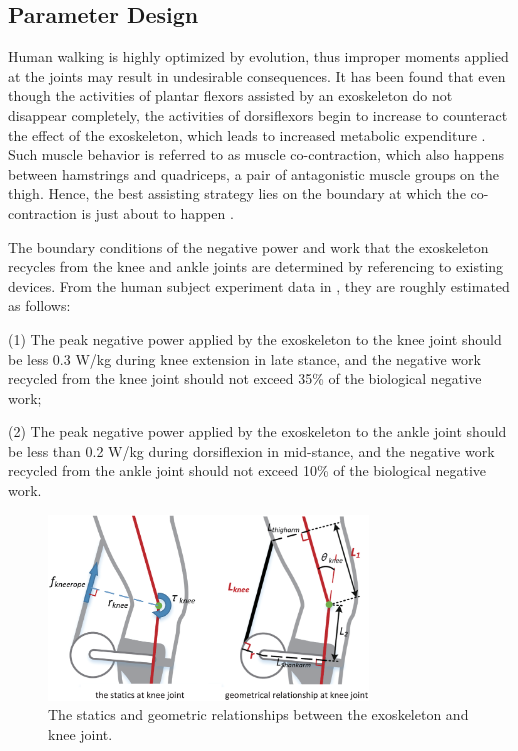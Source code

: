 \documentclass[twocolumn,cleanfoot,10pt]{asme2ej}
\begin{document}
\subsection{Parameter Design}

\label{sec:parameter design}

Human walking is highly optimized by evolution, thus improper moments applied at the joints may result in undesirable consequences.
It has been found that even though the activities of plantar flexors assisted by an exoskeleton do not disappear completely, the activities of dorsiflexors begin to increase to counteract the effect of the exoskeleton, which leads to increased metabolic expenditure \cite{RN4}.
Such muscle behavior is referred to as muscle co-contraction, which also happens between hamstrings and quadriceps, a pair of antagonistic muscle groups on the thigh.
Hence, the best assisting strategy lies on the boundary at which the co-contraction is just about to happen \cite{RN22}. 

The boundary conditions of the negative power and work that the exoskeleton recycles from the knee and ankle joints are determined by referencing to existing devices.
From the human subject experiment data in \cite{RN5,RN18}, they are roughly estimated as follows:

(1) The peak negative power applied by the exoskeleton to the knee joint should be less 0.3 W/kg during knee extension in late stance, and the negative work recycled from the knee joint should not exceed 35\% of the biological negative work;

(2) The peak negative power applied by the exoskeleton to the ankle joint should be less than 0.2 W/kg during dorsiflexion in mid-stance, and the negative work recycled from the ankle joint should not exceed 10\% of the biological negative work.

\begin{figure}[t]
	\centering
	\includegraphics[width=8.5cm]{kneeparameters.eps}
	\caption{The statics and geometric relationships between the exoskeleton and knee joint.}
	\label{fig:kneeparameters}
\end{figure}
\end{document}
